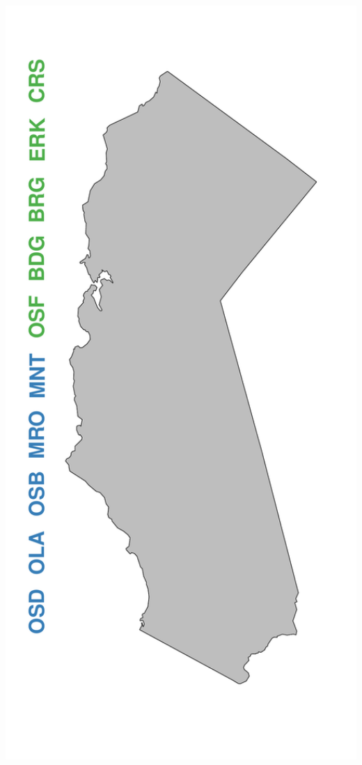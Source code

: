 \documentclass[ xcolor = pdftex, dvipsnames, table ]{beamer}
\begin{document}
\begin{frame}
{\begin{minipage}[h!]{0.19\textwidth}
        \hspace*{-0.25cm}
        \includegraphics[width=1.2\textwidth]{../pictures/mapFullHalfHalf.pdf}

\end{minipage}}
\end{frame}
\end{document}
